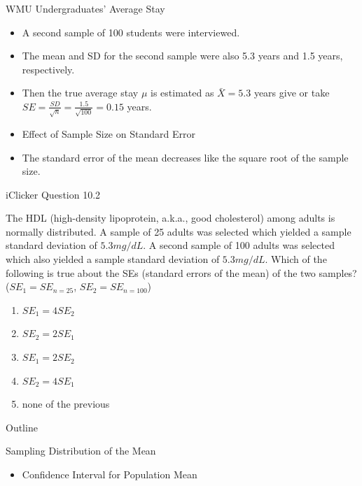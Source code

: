 \documentclass[14pt]{beamer}\usepackage[]{graphicx}\usepackage[]{color}
\begin{document}
\begin{frame}[fragile]{WMU Undergraduates' Average Stay}

\begin{itemize}
\item<1-> A second sample of 100 students were interviewed. 
\item<2-> The mean and SD for the second sample were also 5.3 years and 1.5 years, respectively.  
\item<3-> Then the true average stay $\mu$ is estimated as $\bar{X} = 5.3$ years give or take $SE = \frac{SD}{\sqrt{n}} = \frac{1.5}{\sqrt{100}} = 0.15$ years. 
\item<4-> Effect of Sample Size on Standard Error
\item<5-> The standard error of the mean decreases like the square root of the  sample size.
\end{itemize}
\end{frame}

\begin{frame}[fragile]{iClicker Question 10.2}

{\small{
The HDL (high-density lipoprotein, a.k.a., good cholesterol) among  adults is normally distributed. A sample of 25 adults was selected  which yielded a sample standard deviation of $5.3 mg/dL$. A second  sample of 100 adults was selected which also yielded a sample  standard deviation of $5.3 mg/dL$. Which of the following is true about  the SEs (standard errors of the mean) of the two samples? ($SE_1 = SE_{n=25}$, $SE_2 = SE_{n=100}$)

\begin{enumerate}
\item $SE_1 = 4 SE_2$
\item $SE_2 = 2 SE_1$
\item $SE_1 = 2 SE_2$
\item $SE_2 = 4 SE_1$
\item none of the previous
\end{enumerate}
}}
\end{frame}

\begin{frame}[fragile]{Outline}

Sampling Distribution of the Mean  

\begin{itemize}
\item Confidence Interval for Population Mean
\end{itemize}
\end{frame}
\end{document}
